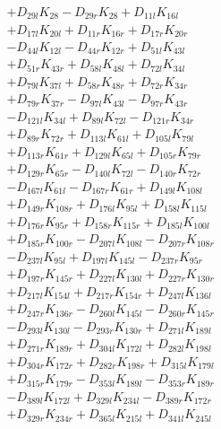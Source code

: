 \begin{multicols}{2}
\begin{align}
&+ D_{29l}K_{28} - D_{29r}K_{28} + D_{11l}K_{16l}  \nonumber \\
&+ D_{17l}K_{20l} + D_{11r}K_{16r} + D_{17r}K_{20r}  \nonumber \\
&- D_{44l}K_{12l} - D_{44r}K_{12r} + D_{51l}K_{43l}  \nonumber \\
&+ D_{51r}K_{43r} + D_{58l}K_{48l} + D_{72l}K_{34l}  \nonumber \\
&+ D_{79l}K_{37l} + D_{58r}K_{48r} + D_{72r}K_{34r}  \nonumber \\
&+ D_{79r}K_{37r} - D_{97l}K_{43l} - D_{97r}K_{43r}  \nonumber \\
&- D_{121l}K_{34l} + D_{89l}K_{72l} - D_{121r}K_{34r}  \nonumber \\
&+ D_{89r}K_{72r} + D_{113l}K_{61l} + D_{105l}K_{79l}  \nonumber \\
&+ D_{113r}K_{61r} + D_{129l}K_{65l} + D_{105r}K_{79r}  \nonumber \\
&+ D_{129r}K_{65r} - D_{140l}K_{72l} - D_{140r}K_{72r}  \nonumber \\
&- D_{167l}K_{61l} - D_{167r}K_{61r} + D_{149l}K_{108l}  \nonumber \\
&+ D_{149r}K_{108r} + D_{176l}K_{95l} + D_{158l}K_{115l}  \nonumber \\
&+ D_{176r}K_{95r} + D_{158r}K_{115r} + D_{185l}K_{100l}  \nonumber \\
&+ D_{185r}K_{100r} - D_{207l}K_{108l} - D_{207r}K_{108r}  \nonumber \\
&- D_{237l}K_{95l} + D_{197l}K_{145l} - D_{237r}K_{95r}  \nonumber \\
&+ D_{197r}K_{145r} + D_{227l}K_{130l} + D_{227r}K_{130r}  \nonumber \\
&+ D_{217l}K_{154l} + D_{217r}K_{154r} + D_{247l}K_{136l}  \nonumber \\
&+ D_{247r}K_{136r} - D_{260l}K_{145l} - D_{260r}K_{145r}  \nonumber \\
&- D_{293l}K_{130l} - D_{293r}K_{130r} + D_{271l}K_{189l}  \nonumber \\
&+ D_{271r}K_{189r} + D_{304l}K_{172l} + D_{282l}K_{198l}  \nonumber \\
&+ D_{304r}K_{172r} + D_{282r}K_{198r} + D_{315l}K_{179l}  \nonumber \\
&+ D_{315r}K_{179r} - D_{353l}K_{189l} - D_{353r}K_{189r}  \nonumber \\
&- D_{389l}K_{172l} + D_{329l}K_{234l} - D_{389r}K_{172r}  \nonumber \\
&+ D_{329r}K_{234r} + D_{365l}K_{215l} + D_{341l}K_{245l}  \nonumber \\

\end{align}
\end{multicols}
